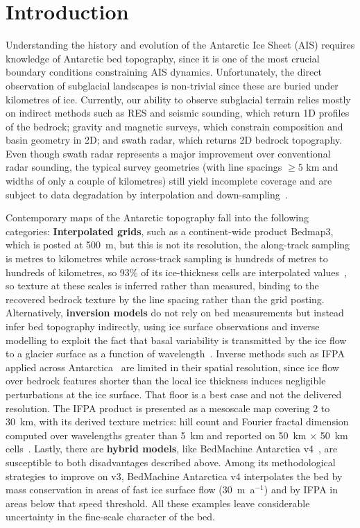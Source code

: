 \chapter{Introduction}\label{intro}

Understanding the history and evolution of the Antarctic Ice Sheet (AIS) requires knowledge of Antarctic bed topography, since it is one of the most crucial boundary 
conditions constraining AIS dynamics. Unfortunately, the direct observation of subglacial landscapes is non-trivial since these are buried under kilometres of ice.
Currently, our ability to observe subglacial terrain relies mostly on indirect methods such as RES and seismic sounding, which return 1D profiles of the bedrock; gravity and magnetic surveys, which constrain composition and basin geometry in 2D; and swath radar, which returns 2D bedrock topography. Even though swath radar represents a major improvement over conventional radar sounding, the typical survey geometries (with line spacings $\geq5$ km and widths of only a couple of kilometres) still yield incomplete coverage and are subject to data degradation by interpolation and down-sampling~\cite{Holschuh_2020}. 

Contemporary maps of the Antarctic topography fall into the following categories: 
\textbf{Interpolated grids}, such as a continent-wide product Bedmap3, which is posted at 500~m, but this is not its resolution, the along-track sampling is metres to kilometres while across-track sampling is hundreds of metres to hundreds of kilometres, so 93\% of its ice-thickness cells are interpolated values~\cite{Pritchard_2025}, so texture at these scales is inferred rather than measured, binding to the recovered bedrock texture by the line spacing
rather than the grid posting. Alternatively, \textbf{inversion models} do not rely on bed measurements but instead infer bed topography indirectly, using ice surface observations and inverse modelling to exploit the fact that basal variability is transmitted by the ice flow to a glacier surface as a function of wavelength~\cite{Gudmundsson_2003}. Inverse methods such as IFPA applied across Antarctica~\cite{Ockenden_2026} are limited in their spatial resolution, since ice flow over bedrock features shorter than the local ice thickness induces negligible perturbations at the ice surface. That floor is a best case and not the delivered resolution. The IFPA product is presented as a mesoscale map covering 2 to 30~km, with its derived texture metrics: hill count and Fourier fractal dimension computed over wavelengths greater than 5~km and reported on 50~km $\times$ 50~km cells~\cite{Ockenden_2026}. Lastly, there are \textbf{hybrid models}, like BedMachine Antarctica v4~\cite{Morlighem_2026}, are susceptible to both disadvantages described above. Among its methodological strategies to improve on v3, BedMachine Antarctica v4 interpolates the bed by mass conservation in areas of fast ice surface flow (30~m~a$^{-1}$) and by IFPA in areas below that speed threshold. All these examples leave considerable uncertainty in the fine-scale character of the bed.

